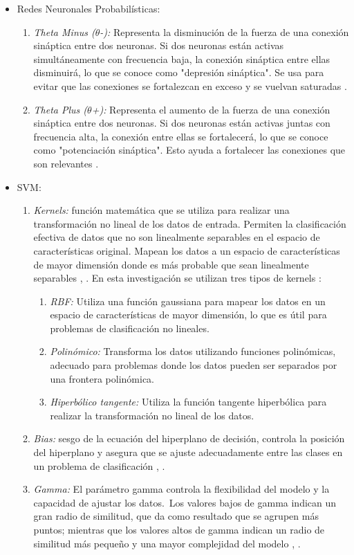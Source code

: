\begin{itemize}
	\item Redes Neuronales Probabilísticas:
	\begin{enumerate}
		\item \textit{Theta Minus ($\theta$-):} Representa la disminución de la fuerza de una conexión sináptica entre dos neuronas. Si dos neuronas están activas simultáneamente con frecuencia baja, la conexión sináptica entre ellas disminuirá, lo que se conoce como "depresión sináptica". Se usa para evitar que las conexiones se fortalezcan en exceso y se vuelvan saturadas \citep{hastie2009elements}.
		\item \textit{Theta Plus ($\theta$+):} Representa el aumento de la fuerza de una conexión sináptica entre dos neuronas. Si dos neuronas están activas juntas con frecuencia alta, la conexión entre ellas se fortalecerá, lo que se conoce como "potenciación sináptica". Esto ayuda a fortalecer las conexiones que son relevantes \citep{hastie2009elements}.
	\end{enumerate}
	\item SVM:
	\begin{enumerate}
		\item \textit{Kernels:} función matemática que se utiliza para realizar una transformación no lineal de los datos de entrada. Permiten la clasificación efectiva de datos que no son linealmente separables en el espacio de características original. Mapean los datos a un espacio de características de mayor dimensión donde es más probable que sean linealmente separables \citep{joachims2002learning}, \citep{montavon2012neural}. En esta investigación se utilizan tres tipos de kernels \citep{joachims2002learning}:
		\begin{enumerate}
			\item \textit{RBF:} Utiliza una función gaussiana para mapear los datos en un espacio de características de mayor dimensión, lo que es útil para problemas de clasificación no lineales.
			\item \textit{Polinómico:} Transforma los datos utilizando funciones polinómicas, adecuado para problemas donde los datos pueden ser separados por una frontera polinómica.
			\item \textit{Hiperbólico tangente:} Utiliza la función tangente hiperbólica para realizar la transformación no lineal de los datos.
		\end{enumerate}
		\item \textit{Bias:} sesgo de la ecuación del hiperplano de decisión, controla la posición del hiperplano y asegura que se ajuste adecuadamente entre las clases en un problema de clasificación \citep{bishop2006pattern}, \citep{joachims2002learning}.
		\item \textit{Gamma:} El parámetro gamma controla la flexibilidad del modelo y la capacidad de ajustar los datos. Los valores bajos de gamma indican un gran radio de similitud, que da como resultado que se agrupen más puntos; mientras que los valores altos de gamma indican un radio de similitud más pequeño y una mayor complejidad del modelo \citep{montavon2012neural}, \citep{joachims2002learning}.
	\end{enumerate}
\end{itemize}
